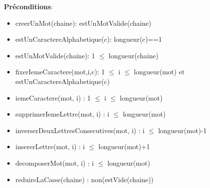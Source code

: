     \textbf{Préconditions}: \begin{itemize}[label=$\- $, leftmargin=2cm, itemsep=0cm]
    	\item creerUnMot(chaine):  estUnMotValide(chaine)
    	\item estUnCaractereAlphabetique(c): longueur(c)==1
    	\item estUnMotValide(chaine): 1 $\leq$ longueur(chaine)
    	\item fixerIemeCaractere(mot,i,c): 1 $\leq$ i $\leq$ longueur(mot) et estUnCaractereAlphabetique(c)
        \item iemeCaractere(mot, i) : 1 $\leq$ i $\leq$ longueur(mot)
        \item supprimerIemeLettre(mot, i) : i $\leq$ longueur(mot)
        \item inverserDeuxLettresConsecutives(mot, i) : i $\leq$ longueur(mot)-1
        \item insererLettre(mot, i) : i $\leq$ longueur(mot)+1
        \item decomposerMot(mot, i) : i $\leq$ longueur(mot)
        \item reduireLaCasse(chaine) : non(estVide(chaine))
    \end{itemize}

